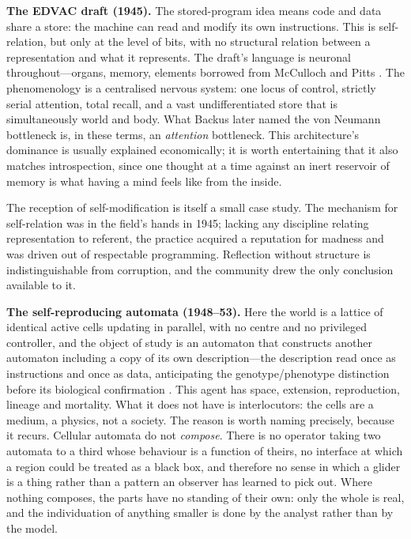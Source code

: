 \documentclass[11pt,a4paper]{article}
\begin{document}
\textbf{The EDVAC draft (1945).} The stored-program idea means code and data share
a store: the machine can read and modify its own instructions. This is
self-relation, but only at the level of bits, with no structural relation between
a representation and what it represents. The draft's language is neuronal
throughout---organs, memory, elements borrowed from McCulloch and Pitts
\cite{vonneumann1945,mcculloch1943}. The phenomenology is a centralised nervous
system: one locus of control, strictly serial attention, total recall, and a vast
undifferentiated store that is simultaneously world and body. What Backus later
named the von Neumann bottleneck is, in these terms, an \emph{attention}
bottleneck. This architecture's dominance is usually explained economically; it is
worth entertaining that it also matches introspection, since one thought at a time
against an inert reservoir of memory is what having a mind feels like from the
inside.

The reception of self-modification is itself a small case study. The mechanism for
self-relation was in the field's hands in 1945; lacking any discipline relating
representation to referent, the practice acquired a reputation for madness and was
driven out of respectable programming. Reflection without structure is
indistinguishable from corruption, and the community drew the only conclusion
available to it.

\textbf{The self-reproducing automata (1948--53).} Here the world is a lattice of
identical active cells updating in parallel, with no centre and no privileged
controller, and the object of study is an automaton that constructs another
automaton including a copy of its own description---the description read once as
instructions and once as data, anticipating the genotype/phenotype distinction
before its biological confirmation \cite{vonneumann1966}. This agent has space,
extension, reproduction, lineage and mortality. What it does not have is
interlocutors: the cells are a medium, a physics, not a society. The reason is
worth naming precisely, because it recurs. Cellular automata do not
\emph{compose}. There is no operator taking two automata to a third whose
behaviour is a function of theirs, no interface at which a region could be
treated as a black box, and therefore no sense in which a glider is a thing
rather than a pattern an observer has learned to pick out. Where nothing
composes, the parts have no standing of their own: only the whole is real, and
the individuation of anything smaller is done by the analyst rather than by the
model.
\end{document}
